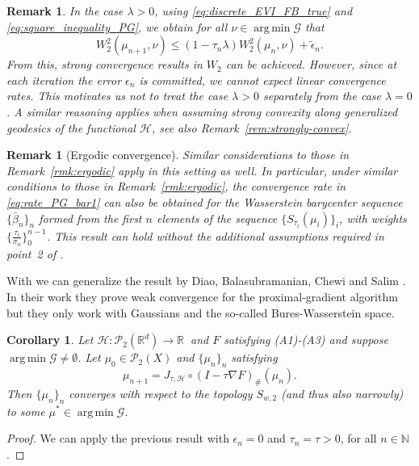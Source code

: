 \documentclass[11pt]{article}
\DeclareMathOperator*{\argmin}{arg\,min}
\newtheorem{corollary}[theorem]{Corollary}
\newtheorem{remark}[theorem]{Remark}
\newcommand{\cP}{\mathcal{P}}
\newcommand{\cG}{\mathcal{G}}
\newcommand{\cT}{S}
\newcommand{\calH}{\mathcal{H}}
\newcommand{\R}{\mathbb{R}}
\newcommand{\N}{\mathbb{N}}
\numberwithin{equation}{section}
\begin{document}
\begin{remark}
		In the case $\lambda > 0$, using \eqref{eq:discrete_EVI_FB_true} and \eqref{eq:square_inequality_PG}, we obtain for all $\nu \in \argmin \cG$ that
		\[W_2^2(\mu_{n+1}, \nu)\leq (1-\tau_n \lambda)W_2^2(\mu_n,\nu)+\tilde{\epsilon}_n.\]
		From this, strong convergence results in $W_2$ can be achieved. However, since at each iteration the error $\epsilon_n$ is committed, we cannot expect linear convergence rates. This motivates us not to treat the case $\lambda > 0$ separately from the case $\lambda = 0$. A similar reasoning applies when assuming strong convexity along generalized geodesics of the functional $\mathcal{H}$, see also Remark~\ref{rem:strongly-convex}.
	\end{remark}
	\begin{remark}[Ergodic convergence]
		Similar considerations to those in Remark~\ref{rmk:ergodic} apply in this setting as well. In particular, under similar conditions to those in Remark~\ref{rmk:ergodic}, the convergence rate in \eqref{eq:rate_PG_bar1} can also be obtained for the Wasserstein barycenter sequence $\{\bar \beta_n\}_n$ formed from the first $n$ elements of the sequence $\{S_{\tau_i}(\mu_i)\}_i$, with weights $\{\frac{\tau_i}{\sigma_n}\}_0^{n-1}$. This result can hold without the additional assumptions required in point~2 of .
\end{remark}

With  we can generalize the result by Diao, Balasubramanian, Chewi and Salim \cite[Theorem 5.3]{diao2023}. In their work they prove weak convergence for the proximal-gradient algorithm but they only work with Gaussians and the so-called Bures-Wasserstein space.
\begin{corollary}\label{cor:fb_convergence}
	Let $\mathcal{H} : \cP_2(\R^d) \to \mathbb{R} \ $ and $F$ satisfying (A1)-(A3) and suppose $\argmin \cG \neq \emptyset$. Let $\mu_{0}\in \cP_2(X)$ and $\{\mu_n\}_n$ satisfying
	\[\mu_{n+1}=J_{\tau , \calH}\circ (I-\tau \nabla F)_{\#}(\mu_n).\]
	Then $\{\mu_n\}_n$ converges with respect to the topology $\cT_{w,2}$ (and thus also narrowly) to some $\mu^*\in \argmin \cG$.
\end{corollary}
\begin{proof}
	We can apply the previous result with $\epsilon_n=0$ and $\tau_n=\tau>0$, for all $n\in \N$.
\end{proof}
\end{document}
